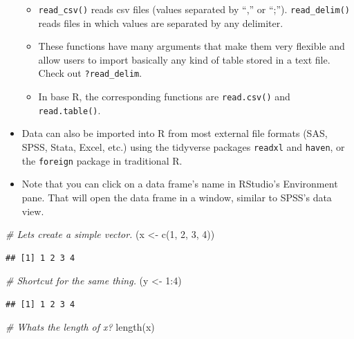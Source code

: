 \documentclass[
]{book}
\newenvironment{Shaded}{\begin{snugshade}}{\end{snugshade}}
\newcommand{\CommentTok}[1]{\textcolor[rgb]{0.56,0.35,0.01}{\textit{#1}}}
\newcommand{\DecValTok}[1]{\textcolor[rgb]{0.00,0.00,0.81}{#1}}
\newcommand{\FunctionTok}[1]{\textcolor[rgb]{0.00,0.00,0.00}{#1}}
\newcommand{\NormalTok}[1]{#1}
\newcommand{\OtherTok}[1]{\textcolor[rgb]{0.56,0.35,0.01}{#1}}
\newcommand{\SpecialCharTok}[1]{\textcolor[rgb]{0.00,0.00,0.00}{#1}}
\providecommand{\tightlist}{%
  \setlength{\itemsep}{0pt}\setlength{\parskip}{0pt}}
\begin{document}
\begin{itemize}
  \begin{itemize}
  \tightlist
  \item
    \texttt{read\_csv()} reads csv files (values separated by ``,'' or ``;''). \texttt{read\_delim()} reads files in which values are separated by any delimiter.
  \item
    These functions have many arguments that make them very flexible and allow users to import basically any kind of table stored in a text file. Check out \texttt{?read\_delim}.
  \item
    In base R, the corresponding functions are \texttt{read.csv()} and \texttt{read.table()}.
  \end{itemize}
\item
  Data can also be imported into R from most external file formats (SAS, SPSS, Stata, Excel, etc.) using the tidyverse packages \texttt{readxl} and \texttt{haven}, or the \texttt{foreign} package in traditional R.
\item
  Note that you can click on a data frame's name in RStudio's Environment pane. That will open the data frame in a window, similar to SPSS's data view.
\end{itemize}

\begin{Shaded}
\begin{Highlighting}[]
\CommentTok{\# Let\textquotesingle{}s create a simple vector.}
\NormalTok{(x }\OtherTok{\textless{}{-}} \FunctionTok{c}\NormalTok{(}\DecValTok{1}\NormalTok{, }\DecValTok{2}\NormalTok{, }\DecValTok{3}\NormalTok{, }\DecValTok{4}\NormalTok{))}
\end{Highlighting}
\end{Shaded}

\begin{verbatim}
## [1] 1 2 3 4
\end{verbatim}

\begin{Shaded}
\begin{Highlighting}[]
\CommentTok{\# Shortcut for the same thing.}
\NormalTok{(y }\OtherTok{\textless{}{-}} \DecValTok{1}\SpecialCharTok{:}\DecValTok{4}\NormalTok{)}
\end{Highlighting}
\end{Shaded}

\begin{verbatim}
## [1] 1 2 3 4
\end{verbatim}

\begin{Shaded}
\begin{Highlighting}[]
\CommentTok{\# What\textquotesingle{}s the length of x?}
\FunctionTok{length}\NormalTok{(x)}
\end{Highlighting}
\end{Shaded}
\end{document}
